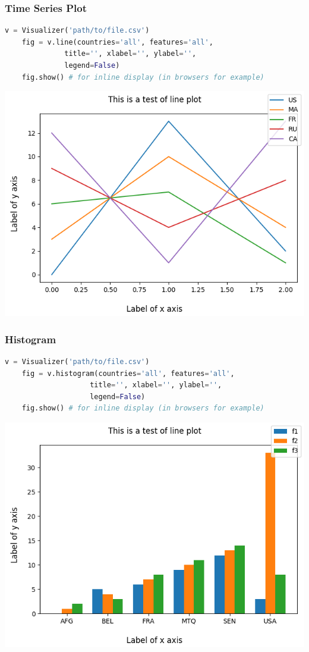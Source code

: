 \begin{frame}[fragile,shrink=30]
  \frametitle{Time Series Plot}
  \begin{lstlisting}[language=Python]
    v = Visualizer('path/to/file.csv')
    fig = v.line(countries='all', features='all',
              title='', xlabel='', ylabel='', 
              legend=False)
    fig.show() # for inline display (in browsers for example)
      \end{lstlisting}
    \begin{center}
    \includegraphics[scale=0.6]{beamer/inc/graphics/line.png}
    \end{center}
\end{frame}

\begin{frame}[fragile,shrink=30]
  \frametitle{Histogram}
    \begin{lstlisting}[language=Python]
    v = Visualizer('path/to/file.csv')
    fig = v.histogram(countries='all', features='all',
                    title='', xlabel='', ylabel='', 
                    legend=False)
    fig.show() # for inline display (in browsers for example)
    \end{lstlisting}
    \begin{center}
    \includegraphics[scale=0.6]{beamer/inc/graphics/histogram.png}
    \end{center}
\end{frame}

